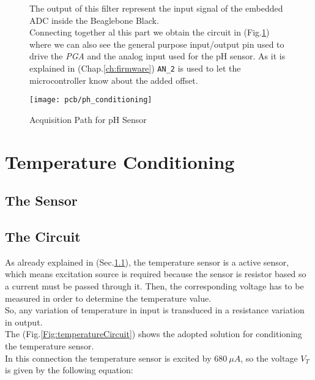 	\newpage
	\begin{figure}[t]
The output of this filter represent the input signal of the embedded ADC inside the Beaglebone Black.\\

Connecting together al this part we obtain the circuit in (Fig.\ref{Fig:pHConditioning}) where we can also see the general purpose input/output pin used to drive the \textit{PGA} and the analog input used for the pH sensor. As it is explained in (Chap.\ref{ch:firmware}) \texttt{AN\_2} is used to let the microcontroller know about the added offset.

\vspace{10mm}

\centering
\texttt{[image: pcb/ph\_conditioning]}
\caption{Acquisition Path for pH Sensor}
\label{Fig:pHConditioning}
\end{figure}






\newpage
\clearpage

\section{Temperature Conditioning}
\subsection{The Sensor}\label{sec:sensorT}

\subsection{The Circuit}

As already explained in (Sec.\ref{sec:sensorT}), the temperature sensor is a active sensor, which means excitation source is required because the sensor is resistor based so a current must be passed through it. Then, the corresponding voltage has to be measured in order to determine the temperature value.\\
So, any variation of temperature in input is transduced in a resistance variation in output.\\

The (Fig.\ref{Fig:temperatureCircuit}) shows the adopted solution for conditioning the temperature sensor.\\
In this connection the temperature sensor is excited by $680\ \mu A$, so the voltage $V_T$ is given by the following equation:

